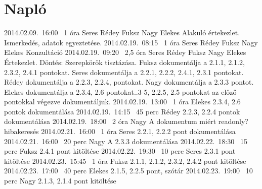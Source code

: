 %
\section{Napló}

\begin{naplo}

\bejegyzes
{2014.02.09.~16:00~}
{1 óra}
{Seres\newline
Rédey\newline
Fuksz\newline
Nagy\newline
Elekes}
{Alakuló értekezlet.
Ismerkedés, adatok egyeztetése.}
\bejegyzes
{2014.02.19.~08:15~}
{1 óra}
{Seres\newline
Rédey\newline
Fuksz\newline
Nagy\newline
Elekes}
{Konzultáció}
\bejegyzes
{2014.02.19.~09:20~}
{2,5 óra}
{Seres \newline
Rédey\newline
Fuksz\newline
Nagy\newline
Elekes}
{Értekezlet. Döntés: Szerepkörök tisztázása.\newline
Fuksz dokumentálja a 2.1.1, 2.1.2, 2.3.2, 2.4.1 pontokat.\newline
Seres dokumentálja a 2.2.1, 2.2.2, 2.4.1, 2.3.1 pontokat.\newline
Rédey dokumentálja a 2.2.3, 2.2.4, pontokat.\newline
Nagy dokumentálja a 2.3.3 pontot.\newline
Elekes dokumentálja a 2.3.4, 2.6 pontokat..3-5, 2.2.5, 2.5 pontokat az előző pontokkal végezve dokumentáljuk.}
\bejegyzes
{2014.02.19.~13:00~}
{1 óra}
{Elekes}
{2.3.4, 2.6 pontok dokumentálása}
\bejegyzes
{2014.02.19.~14:15~}
{45 perc}
{Rédey}
{2.2.3, 2.2.4 pontok dokumentálása}
\bejegyzes
{2014.02.19.~18:00~}
{2 óra}
{Nagy}
{A dokumentum miért readonly? hibakeresés}
\bejegyzes
{2014.02.21.~16:00~}
{1 óra}
{Seres}
{2.2.1, 2.2.2 pont dokumentálása}
\bejegyzes
{2014.02.21.~16:00~}
{20 perc}
{Nagy}
{A 2.3.3 dokumentálása}
\bejegyzes
{2014.02.22.~18:30~}
{15 perc}
{Fuksz}
{2.4.1 pont kitöltése}
\bejegyzes
{2014.02.22.~19:30~}
{10 perc}
{Seres}
{2.3.1 pont kitöltése}		
\bejegyzes
{2014.02.23.~15:45~}
{1 óra}
{Fuksz}
{2.1.1, 2.1.2, 2.3.2, 2.4.2 pont kitöltése}
\bejegyzes
{2014.02.23.~17:00~}
{40 perc}
{Elekes}
{2.1.5, 2.2.5 pont, szótár}
\bejegyzes
{2014.02.23.~19:00~}
{10 perc}
{Nagy}
{2.1.3, 2.1.4 pont kitöltése}
		

\end{naplo}

